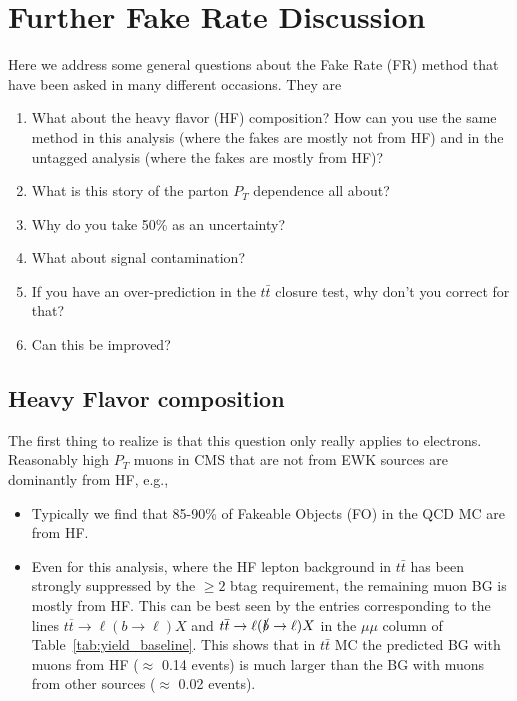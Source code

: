 \section{Further Fake Rate Discussion}
\label{sec:frFAQ}

Here we address some general questions about the 
Fake Rate (FR) method that have been asked in many 
different occasions.  They are
\begin{enumerate}

\item What about the heavy flavor (HF) composition?  How can you
use the same method in this analysis (where the fakes are mostly
not from HF) and in the untagged analysis (where the fakes are 
mostly from HF)?

\item What is this story of the parton $P_T$ dependence all
about?

\item Why do you take 50\% as an uncertainty?

\item What about signal contamination?

\item If you have an over-prediction in the $t\bar{t}$ 
closure test, why don't you correct for that?

\item Can this be improved?

\end{enumerate}

\subsection{Heavy Flavor composition}
\label{sec:HF}

The first thing to realize is that this question only really 
applies to electrons.  Reasonably high $P_T$
muons in CMS that are not from EWK sources
are dominantly from HF, e.g.,

\begin{itemize}

\item Typically we find that 85-90\% of Fakeable Objects (FO) 
in the QCD MC are from HF. 

\item Even for this analysis, where the HF lepton background
in $t\bar{t}$ has been strongly suppressed by the 
$\geq 2$ btag requirement,
the remaining muon BG is mostly from HF.
This can be best seen by the entries corresponding to the 
lines $t\overline{t}\rightarrow \ell(b\rightarrow \ell)X$
and $t\overline{t}\rightarrow \ell(\slashed{b}\rightarrow \ell)X$
in the $\mu\mu$ column of Table~\ref{tab:yield_baseline}.
This shows that in $t\bar{t}$ MC the predicted BG with 
muons from HF ($\approx$ 0.14 events) is much larger than the 
BG with muons from other sources ($\approx$ 0.02 events).

\end{itemize}

